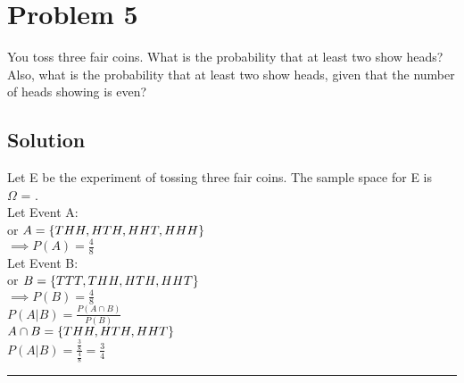 \section{Problem 5}
You toss three fair coins. What is the probability that at least two show heads? Also, what is the probability that at least two show heads, given that the number of heads showing is even?

\subsection{Solution}
Let E be the experiment of tossing three fair coins.
The sample space for E is\\
 $\Omega$ = .\\
Let Event A:  \\
or $A = \{THH, HTH, HHT, HHH\}$\\[5pt]
$\implies P(A) = \frac{4}{8}$ \\[5pt]
Let Event B:  \\
or $B = \{TTT, THH, HTH, HHT\}$ \\[5pt]
$\implies P(B) = \frac{4}{8}$ \\[5pt]
$P(A|B) = \frac{P(A \cap B)}{P(B)}$\\
$A \cap B = \{THH, HTH, HHT\}$ \\[5pt]
$P(A|B) = \frac{\frac{3}{8}}{\frac{4}{8}} = \frac{3}{4}$ 

\noindent\rule{\textwidth}{1pt}